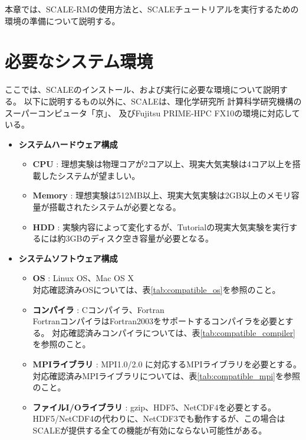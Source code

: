 
本章では、SCALE-RMの使用方法と、SCALEチュートリアルを実行するための環境の準備について説明する。

\section{必要なシステム環境}
\label{sec:req_env}
ここでは、SCALEのインストール、および実行に必要な環境について説明する。
以下に説明するもの以外に、SCALEは、理化学研究所 計算科学研究機構のスーパーコンピュータ「京」、
及びFujitsu PRIME-HPC FX10の環境に対応している。

\begin{itemize}
  \item {\bf システムハードウェア構成}
  \begin{itemize}
    \item {\bf CPU} : 理想実験は物理コアが2コア以上、現実大気実験は4コア以上を搭載したシステムが望ましい。
    \item {\bf Memory} : 理想実験は512MB以上、現実大気実験は2GB以上のメモリ容量が搭載されたシステムが必要となる。
    \item {\bf HDD} : 実験内容によって変化するが、Tutorialの現実大気実験を実行するには約3GBのディスク空き容量が必要となる。
  \end{itemize}

  \item {\bf システムソフトウェア構成}
  \begin{itemize}
  \item {\bf OS} : Linux OS、Mac OS X\\
        対応確認済みOSについては、表\ref{tab:compatible_os}を参照のこと。
  \item {\bf コンパイラ} : Cコンパイラ、Fortran\\
        FortranコンパイラはFortran2003をサポートするコンパイラを必要とする。
        対応確認済みコンパイラについては、表\ref{tab:compatible_compiler}を参照のこと。
  \item {\bf MPIライブラリ} : MPI1.0/2.0 に対応するMPIライブラリを必要とする。
        対応確認済みMPIライブラリについては、表\ref{tab:compatible_mpi}を参照のこと。
  \item {\bf ファイルI/Oライブラリ} : gzip、HDF5、NetCDF4を必要とする。\\
        HDF5/NetCDF4の代わりに、NetCDF3でも動作するが、この場合はSCALEが提供する全ての機能が有効にならない可能性がある。
  \end{itemize}
\end{itemize}


